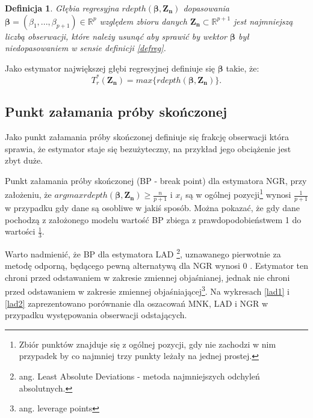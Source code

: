 \documentclass[man,mfu]{mgrwms}
\newtheorem{deff}{Definicja}
\begin{document}
\begin{deff}
Głębia regresyjna $rdepth(\mathbf{\beta,Z_n})$ dopasowania $ \mathbf{\beta} = (\beta_1,...,\beta_{p+1}) \in \mathbb{R}^p$ względem zbioru danych $\mathbf{Z_n} \subset \mathbb{R}^{p+1} $ jest najmniejszą liczbą obserwacji, które należy usunąć aby sprawić by wektor $\mathbf{\beta}$ był niedopasowaniem w sensie definicji \ref{defreg}.
\end{deff}


Jako estymator największej głębi regresyjnej definiuje się $\mathbf{\beta}$ takie, że:
\begin{equation}
T^*_r(\mathbf{Z_n}) = max\{rdepth(\mathbf{\beta},\mathbf{Z_n})\}.
\end{equation}


\subsection{Punkt załamania próby skończonej}

Jako punkt załamania próby skończonej definiuje się frakcję obserwacji która sprawia, że estymator staje się bezużyteczny, na przykład jego obciążenie jest zbyt duże.

Punkt załamania próby skończonej (BP - break point) dla estymatora NGR, przy założeniu, że $argmax rdepth(\mathbf{\beta,Z_n}) \geq \frac{n}{p+1}$ i $x_i$ są w ogólnej pozycji\footnote{Zbiór punktów znajduje się z ogólnej pozycji, gdy nie zachodzi w nim przypadek by co najmniej trzy punkty leżały na jednej prostej.} wynosi $\frac{1}{p+1}$ w przypadku gdy dane są osobliwe w jakiś sposób. Można pokazać, że gdy dane pochodzą z założonego modelu wartość BP zbiega z prawdopodobieństwem 1 do wartości $\frac{1}{3}$.

Warto nadmienić, że BP dla estymatora LAD \footnote{ang. Least Absolute Deviations - metoda najmniejszych odchyleń absolutnych.}, uznawanego pierwotnie za metodę odporną, będącego pewną alternatywą dla NGR wynosi 0 \cite{lad}. Estymator ten chroni przed odstawaniem w zakresie zmiennej objaśnianej, jednak nie chroni przed odstawaniem w zakresie zmiennej objaśniającej\footnote{ang. leverage points}. Na wykresach \ref{lad1} i \ref{lad2} zaprezentowano porównanie dla oszacowań MNK, LAD i NGR w przypadku występowania obserwacji odstających.
\end{document}
